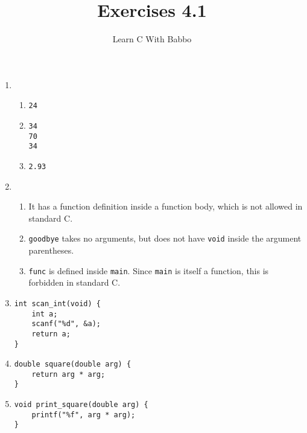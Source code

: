 \documentclass{article}
\begin{document}
\title{Exercises 4.1}
\author{Learn C With Babbo}
\date{}
\maketitle
\begin{enumerate}
\item
\begin{enumerate}
\item 
\begin{lstlisting}[style=CStyle]
24
\end{lstlisting}

\item
\begin{lstlisting}[style=CStyle]
34
70
34
\end{lstlisting}

\item
\begin{lstlisting}[style=CStyle]
2.93
\end{lstlisting}
\end{enumerate}

\item 
\begin{enumerate}
\item It has a function definition inside a function body, which is not allowed in standard C.
\item \verb|goodbye| takes no arguments, but does not have \verb|void| inside the argument parentheses.
\item \verb|func| is defined inside \verb|main|. Since \verb|main| is itself a function, this is forbidden in standard 
C.
\end{enumerate}

\item
\begin{lstlisting}[style=CStyle]
int scan_int(void) {
    int a;
    scanf("%d", &a);
    return a;
}
\end{lstlisting}

\item
\begin{lstlisting}[style=CStyle]
double square(double arg) {
    return arg * arg;
}
\end{lstlisting}

\item
\begin{lstlisting}[style=CStyle]
void print_square(double arg) {
    printf("%f", arg * arg);
}
\end{lstlisting}
\end{enumerate}
\end{document}
